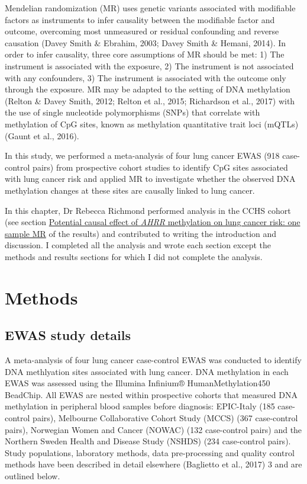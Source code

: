 \documentclass[11pt,twoside]{bristolthesis}
\begin{document}
Mendelian randomization (MR) uses genetic variants associated with modifiable factors as instruments to infer causality between the modifiable factor and outcome, overcoming most unmeasured or residual confounding and reverse causation (Davey Smith \& Ebrahim, 2003; Davey Smith \& Hemani, 2014). In order to infer causality, three core assumptions of MR should be met: 1) The instrument is associated with the exposure, 2) The instrument is not associated with any confounders, 3) The instrument is associated with the outcome only through the exposure. MR may be adapted to the setting of DNA methylation (Relton \& Davey Smith, 2012; Relton et al., 2015; Richardson et al., 2017) with the use of single nucleotide polymorphisms (SNPs) that correlate with methylation of CpG sites, known as methylation quantitative trait loci (mQTLs) (Gaunt et al., 2016).

In this study, we performed a meta-analysis of four lung cancer EWAS (918 case-control pairs) from prospective cohort studies to identify CpG sites associated with lung cancer risk and applied MR to investigate whether the observed DNA methylation changes at these sites are causally linked to lung cancer.

In this chapter, Dr Rebecca Richmond performed analysis in the CCHS cohort (see section \protect\hyperlink{potential-causal-effect-of-ahrr-methylation-on-lung-cancer-risk-one-sample-mr}{Potential causal effect of \emph{AHRR} methylation on lung cancer risk: one sample MR} of the results) and contributed to writing the introduction and discussion. I completed all the analysis and wrote each section except the methods and results sections for which I did not complete the analysis.

\hypertarget{methods-3}{%
\section{Methods}\label{methods-3}}

\hypertarget{ewas-study-details}{%
\subsection{EWAS study details}\label{ewas-study-details}}

A meta-analysis of four lung cancer case-control EWAS was conducted to identify DNA methlyation sites associated with lung cancer. DNA methylation in each EWAS was assessed using the Illumina Infinium® HumanMethylation450 BeadChip. All EWAS are nested within prospective cohorts that measured DNA methylation in peripheral blood samples before diagnosis: EPIC-Italy (185 case-control pairs), Melbourne Collaborative Cohort Study (MCCS) (367 case-control pairs), Norwegian Women and Cancer (NOWAC) (132 case-control pairs) and the Northern Sweden Health and Disease Study (NSHDS) (234 case-control pairs). Study populations, laboratory methods, data pre-processing and quality control methods have been described in detail elsewhere (Baglietto et al., 2017) 3 and are outlined below.
\end{document}
